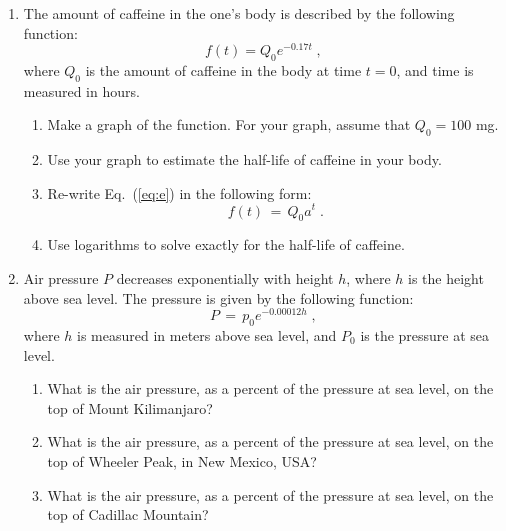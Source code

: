 \documentclass[12pt]{article}
\begin{document}
\begin{enumerate}
\setlength{\itemsep}{8mm}

\item The amount of caffeine in the one's body is described by the
  following function:
  \begin{equation}
    f(t) = Q_0 e^{-0.17t} \;,
    \label{eq:e}
  \end{equation}
  where $Q_0$ is the amount of caffeine in the body at time $t=0$, and
  time is measured in hours.
  \begin{enumerate}
  \item Make a graph of the function.  For your graph, assume that
    $Q_0 = 100$ mg.
  \item Use your graph to estimate the half-life of caffeine in your
    body.
  \item Re-write Eq.~(\ref{eq:e}) in the following form:
    \begin{equation}
      f(t) \, = \, Q_0 a^t \;.
    \end{equation}
  \item Use logarithms to solve exactly for the half-life of caffeine.
  \end{enumerate}

\item Air pressure $P$ decreases exponentially with height $h$, where
  $h$ is the height above sea level.  The pressure is given by the
  following function:
  \begin{equation}
    P \, = \, p_0 e^{-0.00012h} \;,
  \end{equation}
  where $h$ is measured in meters above sea level, and $P_0$ is the
  pressure at sea level.
  \begin{enumerate}
  \item What is the air pressure, as a percent of the pressure at sea 
    level, on the top of Mount Kilimanjaro?
  \item What is the air pressure, as a percent of the pressure at sea 
    level, on the top of Wheeler Peak, in New Mexico, USA?
  \item What is the air pressure, as a percent of the pressure at sea 
    level, on the top of Cadillac Mountain?
  \end{enumerate}
  

\end{enumerate}
\end{document}
